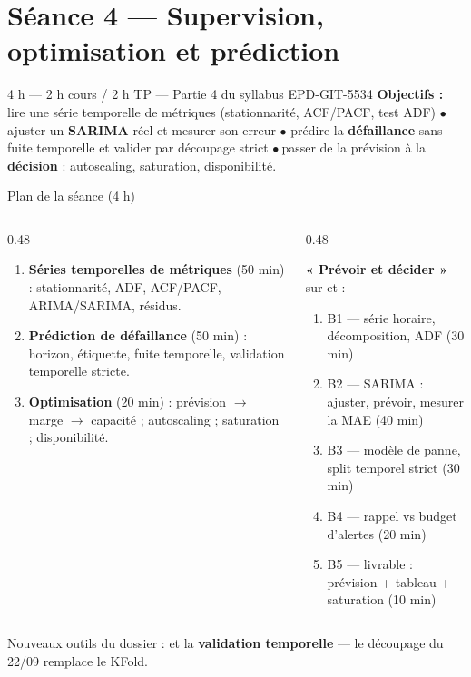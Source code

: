 \section{Séance 4 --- Supervision, optimisation et prédiction}
{4 h --- 2 h cours / 2 h TP --- Partie 4 du syllabus EPD-GIT-5534}
{\textbf{Objectifs :} lire une série temporelle de métriques (stationnarité,
ACF/PACF, test ADF) $ \bullet $ ajuster un \textbf{SARIMA} réel et mesurer
son erreur $ \bullet $ prédire la \textbf{défaillance} sans fuite temporelle
et valider par découpage strict $ \bullet \ $passer de la prévision à la
\textbf{décision} : autoscaling, saturation, disponibilité.}

\begin{frame}{Plan de la séance (4 h)}
\footnotesize%
\begin{columns}[t]
\begin{column}{0.48\textwidth}
\begin{kbox}
\begin{enumerate}
\item \textbf{Séries temporelles de métriques} (50 min) : stationnarité,
ADF, ACF/PACF, ARIMA/SARIMA, résidus.
\item \textbf{Prédiction de défaillance} (50 min) : horizon, étiquette,
fuite temporelle, validation temporelle stricte.
\item \textbf{Optimisation} (20 min) : prévision $\to$ marge $\to$
capacité ; autoscaling ; saturation ; disponibilité.
\end{enumerate}
\end{kbox}
\end{column}
\begin{column}{0.48\textwidth}
\begin{ebox}
\textbf{« Prévoir et décider »} sur  et
 :
\begin{enumerate}
\item B1 --- série horaire, décomposition, ADF (30 min)
\item B2 --- SARIMA : ajuster, prévoir, mesurer la MAE (40 min)
\item B3 --- modèle de panne, split temporel strict (30 min)
\item B4 --- rappel vs budget d'alertes (20 min)
\item B5 --- livrable : prévision + tableau + saturation (10 min)
\end{enumerate}
\end{ebox}
\end{column}
\end{columns}
\vspace{1mm}
\begin{center}\small
Nouveaux outils du dossier :  et la
\textbf{validation temporelle} --- le découpage du 22/09
remplace le KFold.
\end{center}
\end{frame}

